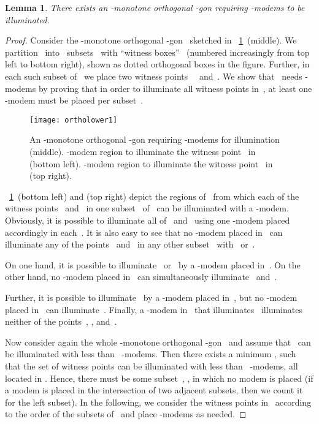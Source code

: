 \documentclass[A4]{article}
\newtheorem{lemma}[theorem]{Lemma}
\begin{document}
\begin{lemma}\label{lem:ortholower1}
  There exists an -monotone orthogonal -gon requiring  \mbox{-modems} to be illuminated.  
\end{lemma}
\begin{proof}
  Consider the -monotone orthogonal -gon~ sketched in \figurename~\ref{fig:ortholower1}~(middle).
  We partition~ into~ subsets~\mbox{} with ``witness boxes''~ (numbered increasingly from top left to bottom right), shown as dotted orthogonal boxes in the figure.
  Further, in each such subset  of~ we place two witness points~~ and~. 
  We show that~ needs  \mbox{-modems} by proving that in order to illuminate all witness points in~, at least one \mbox{-modem} must be placed per subset~.


\begin{figure}[htb]
  \centering
  \texttt{[image: ortholower1]}
  \caption{An -monotone orthogonal -gon requiring  \mbox{-modems} for illumination (middle).
	  \mbox{-modem} region to illuminate the witness point~ in~ (bottom left).
	  \mbox{-modem} region to illuminate the witness point~ in~ (top right).
}
 \label{fig:ortholower1}
\end{figure}


\figurename~\ref{fig:ortholower1}~(bottom left) and (top right) depict the regions of~ from which each of the witness points~ and~ in one subset~ of~ can be illuminated with a \mbox{-modem}. 
Obviously, it is possible to illuminate all of~ and~ using one \mbox{-modem} placed accordingly in each~.
It is also easy to see that no \mbox{-modem} placed in~ can illuminate any of the points~ and~ in any other subset~ with~ or~.

On one hand, it is possible to illuminate~ or~ by a \mbox{-modem} placed in~.
On the other hand, no \mbox{-modem} placed in~ can simultaneously illuminate~ and~.
	
Further, it is possible to illuminate~ by a \mbox{-modem} placed in~, but no \mbox{-modem} placed in~ can illuminate~.
Finally, a \mbox{-modem} in~ that illuminates~ illuminates neither of the points~, , and~.



Now consider again the whole -monotone orthogonal -gon~ and assume that~ can be illuminated with less than~ \mbox{-modems}. 
Then there exists a minimum , such that the set  of witness points can be illuminated with less than~ \mbox{-modems}, all located in . 
Hence, there must be some subset~, , in which no modem is placed (if a modem is placed in the intersection of two adjacent subsets, then we count it for the left subset).
In the following, we consider the witness points in~ according to the order of the subsets of~ and place \mbox{-modems} as needed.
	

\end{proof}
\end{document}
